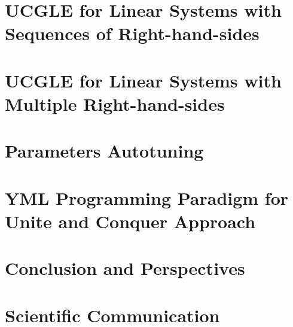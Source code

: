 \documentclass{xinzhewu}
\begin{document}
\chapter{UCGLE for Linear Systems with Sequences of Right-hand-sides}\label{UCGLE for Linear Systems with Sequences of Right-hand-sides}



\chapter{UCGLE for Linear Systems with Multiple Right-hand-sides} \label{UCGLE for Linear Systems with Multiple Right-hand-sides}



\chapter{Parameters Autotuning}  \label{Parameters Autotuning}



\chapter{YML Programming Paradigm for Unite and Conquer Approach} \label{YML and XMP Multi-level Parallelism Programming Paradigm}



\chapter{Conclusion and Perspectives} \label{Conclusion and Pespectives}



\clearemptydoublepage


\clearemptydoublepage

\appendix
\chapter{Scientific Communication}



\clearemptydoublepage
\end{document}
